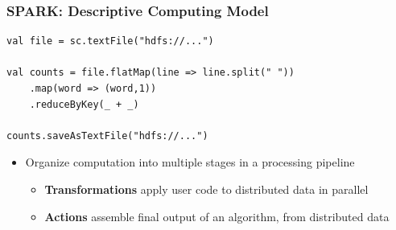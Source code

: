 \begin{frame}[fragile]
\frametitle{SPARK: Descriptive Computing Model}

\begin{lstlisting}
val file = sc.textFile("hdfs://...")

val counts = file.flatMap(line => line.split(" "))
    .map(word => (word,1))
    .reduceByKey(_ + _)

counts.saveAsTextFile("hdfs://...")
\end{lstlisting}


\begin{itemize}
  \item Organize computation into multiple stages in a processing pipeline
  \begin{itemize}
    \item \textbf{Transformations} apply user code to distributed data in parallel
   \item \textbf{Actions} assemble final output of an algorithm, from distributed data
  \end{itemize}
    
  \end{itemize}  
\end{frame}

